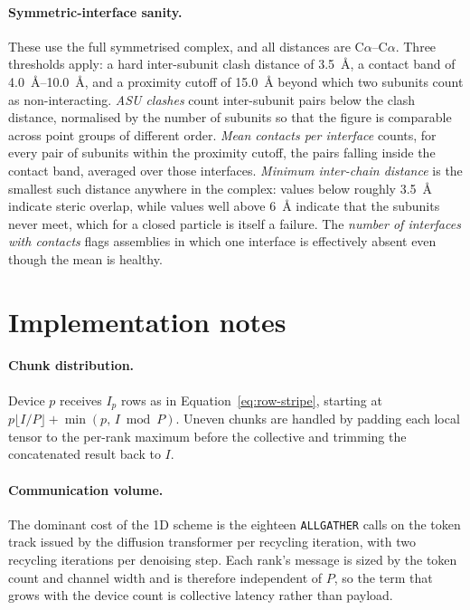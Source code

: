 \paragraph{Symmetric-interface sanity.}
These use the full symmetrised complex, and all distances are
C$\alpha$--C$\alpha$. Three thresholds apply: a hard inter-subunit clash distance
of \SI{3.5}{\angstrom}, a contact band of \SIrange{4.0}{10.0}{\angstrom}, and a
proximity cutoff of \SI{15.0}{\angstrom} beyond which two subunits count as
non-interacting. \emph{ASU clashes} count inter-subunit pairs below the clash
distance, normalised by the number of subunits so that the figure is comparable
across point groups of different order. \emph{Mean contacts per interface}
counts, for every pair of subunits within the proximity cutoff, the pairs falling
inside the contact band, averaged over those interfaces. \emph{Minimum
inter-chain distance} is the smallest such distance anywhere in the complex:
values below roughly \SI{3.5}{\angstrom} indicate steric overlap, while values
well above \SI{6}{\angstrom} indicate that the subunits never meet, which for a
closed particle is itself a failure. The \emph{number of interfaces with
contacts} flags assemblies in which one interface is effectively absent even
though the mean is healthy.

\section{Implementation notes}
\label{app:implementation}

\paragraph{Chunk distribution.}
Device $p$ receives $I_p$ rows as in Equation~\eqref{eq:row-stripe}, starting at
$p\lfloor I/P\rfloor + \min(p,\, I \bmod P)$. Uneven chunks are handled by padding
each local tensor to the per-rank maximum before the collective and trimming the
concatenated result back to $I$.

\paragraph{Communication volume.}
The dominant cost of the 1D scheme is the eighteen \texttt{ALLGATHER} calls on the
token track issued by the diffusion transformer per recycling iteration, with two
recycling iterations per denoising step. Each rank's message is sized by the token
count and channel width and is therefore independent of $P$, so the term that
grows with the device count is collective latency rather than payload.

